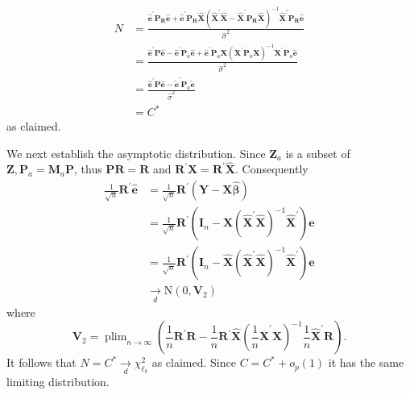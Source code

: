 \documentclass[10pt]{article}
\begin{document}
$$
\begin{aligned}
N &=\frac{\widehat{\boldsymbol{e}}^{\prime} \boldsymbol{P}_{\boldsymbol{R}} \widehat{\boldsymbol{e}}+\widehat{\boldsymbol{e}}^{\prime} \boldsymbol{P}_{\boldsymbol{R}} \widehat{\boldsymbol{X}}\left(\widehat{\boldsymbol{X}}^{\prime} \widehat{\boldsymbol{X}}-\widehat{\boldsymbol{X}}^{\prime} \boldsymbol{P}_{\boldsymbol{R}} \widehat{\boldsymbol{X}}\right)^{-1} \widehat{\boldsymbol{X}}^{\prime} \boldsymbol{P}_{\boldsymbol{R}} \widehat{\boldsymbol{e}}}{\widehat{\sigma}^{2}} \\
&=\frac{\widehat{\boldsymbol{e}}^{\prime} \boldsymbol{P} \widehat{\boldsymbol{e}}-\widehat{\boldsymbol{e}}^{\prime} \boldsymbol{P}_{a} \widehat{\boldsymbol{e}}+\widehat{\boldsymbol{e}}^{\prime} \boldsymbol{P}_{a} \boldsymbol{X}\left(\boldsymbol{X}^{\prime} \boldsymbol{P}_{a} \boldsymbol{X}\right)^{-1} \boldsymbol{X}^{\prime} \boldsymbol{P}_{a} \widehat{\boldsymbol{e}}}{\widehat{\sigma}^{2}} \\
&=\frac{\widehat{\boldsymbol{e}}^{\prime} \boldsymbol{P} \widehat{\boldsymbol{e}}-\widetilde{\boldsymbol{e}}^{\prime} \boldsymbol{P}_{a} \widetilde{\boldsymbol{e}}}{\widehat{\sigma}^{2}} \\
&=C^{*}
\end{aligned}
$$
as claimed.

We next establish the asymptotic distribution. Since $\boldsymbol{Z}_{a}$ is a subset of $\boldsymbol{Z}, \boldsymbol{P}_{a}=\boldsymbol{M}_{a} \boldsymbol{P}$, thus $\boldsymbol{P} \boldsymbol{R}=\boldsymbol{R}$ and $\boldsymbol{R}^{\prime} \boldsymbol{X}=\boldsymbol{R}^{\prime} \widehat{\boldsymbol{X}}$. Consequently
$$
\begin{aligned}
\frac{1}{\sqrt{n}} \boldsymbol{R}^{\prime} \widehat{\boldsymbol{e}} &=\frac{1}{\sqrt{n}} \boldsymbol{R}^{\prime}(\boldsymbol{Y}-\boldsymbol{X} \widehat{\boldsymbol{\beta}}) \\
&=\frac{1}{\sqrt{n}} \boldsymbol{R}^{\prime}\left(\boldsymbol{I}_{n}-\boldsymbol{X}\left(\widehat{\boldsymbol{X}}^{\prime} \widehat{\boldsymbol{X}}\right)^{-1} \widehat{\boldsymbol{X}}^{\prime}\right) \boldsymbol{e} \\
&=\frac{1}{\sqrt{n}} \boldsymbol{R}^{\prime}\left(\boldsymbol{I}_{n}-\widehat{\boldsymbol{X}}\left(\widehat{\boldsymbol{X}}^{\prime} \widehat{\boldsymbol{X}}\right)^{-1} \widehat{\boldsymbol{X}}^{\prime}\right) \boldsymbol{e} \\
& \underset{d}{\longrightarrow} \mathrm{N}\left(0, \boldsymbol{V}_{2}\right)
\end{aligned}
$$
where
$$
\boldsymbol{V}_{2}=\operatorname{plim}_{n \rightarrow \infty}\left(\frac{1}{n} \boldsymbol{R}^{\prime} \boldsymbol{R}-\frac{1}{n} \boldsymbol{R}^{\prime} \widehat{\boldsymbol{X}}\left(\frac{1}{n} \widehat{\boldsymbol{X}}^{\prime} \widehat{\boldsymbol{X}}\right)^{-1} \frac{1}{n} \widehat{\boldsymbol{X}}^{\prime} \boldsymbol{R}\right) .
$$
It follows that $N=C^{*} \underset{d}{\longrightarrow} \chi_{\ell_{b}}^{2}$ as claimed. Since $C=C^{*}+o_{p}(1)$ it has the same limiting distribution.
\end{document}
